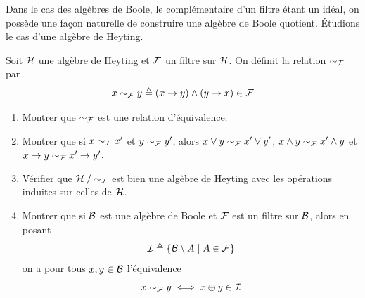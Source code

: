 \begin{exercise}
  Dans le cas des algèbres de Boole, le complémentaire d'un filtre étant
  un idéal, on possède une façon naturelle de construire une algèbre de
  Boole quotient. \'Etudions le cas d'une algèbre de Heyting.

  Soit $\mathcal{H}$ une algèbre de Heyting et $\mathcal{F}$ un filtre sur
  $\mathcal{H}$. On définit la relation $\sim_{\mathcal{F}}$ par
  \[x\sim_{\mathcal{F}} y \triangleq (x \to y) \wedge (y\to x) \in \mathcal{F}\]
  \begin{enumerate}[label=(\roman*)]
  \item Montrer que $\sim_{\mathcal{F}}$ est une relation d'équivalence.
  \item Montrer que si $x \sim_{\mathcal{F}} x' $ et $y \sim_{\mathcal{F}} y'$, alors
    $x\vee y \sim_{\mathcal{F}} x'\vee y'$, $x\wedge y \sim_{\mathcal{F}} x'\wedge y$
    et $x\to y \sim_{\mathcal{F}} x' \to y'$.
  \item Vérifier que $\mathord{\mathcal{H}}\mathbin{/}\mathord{\sim_{\mathcal{F}}}$ est bien une algèbre de
    Heyting avec les opérations induites sur celles de $\mathcal{H}$.
  \item Montrer que si $\mathcal{B}$ est une algèbre de Boole et $\mathcal{F}$ est
    un filtre sur $\mathcal{B}$, alors en posant
    \[\mathcal{I} \triangleq \left\{ \mathcal{B} \setminus A \;\middle\vert\; A \in \mathcal{F} \right\}\]
    on a pour tous $x,y \in \mathcal{B}$ l'équivalence
    \[x \sim_{\mathcal{F}} y \iff x \oplus y \in \mathcal{I}\]
  \end{enumerate}


\end{exercise}
